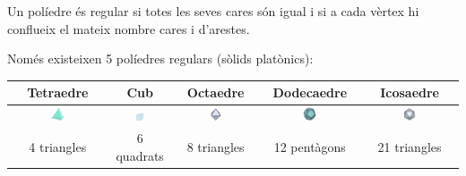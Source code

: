 \begin{theorybox}
	Un políedre és regular si totes les seves cares són igual i si a cada vèrtex hi conflueix el mateix nombre cares i d'arestes.
	
	Només existeixen 5 políedres regulars (sòlids platònics):
	\begin{center}
		\begin{tabular}{|c|c|c|c|c|}\hline
			\rowcolor{lightgray} Tetraedre & Cub & Octaedre & Dodecaedre & Icosaedre \\ \hline
			\includegraphics[width=0.15\textwidth]{img-11/tetraedro} &
			\includegraphics[width=0.15\textwidth]{img-11/poliedro-convexo} &
			\includegraphics[width=0.15\textwidth]{img-11/octaedre} &
			\includegraphics[width=0.15\textwidth]{img-11/dodecaedre} &
			\includegraphics[width=0.15\textwidth]{img-11/icosaedre} \\
			4 triangles &   6 quadrats  & 8 triangles &  12 pentàgons & 21 triangles  \\ \hline
		\end{tabular}
	\end{center}
\end{theorybox}

